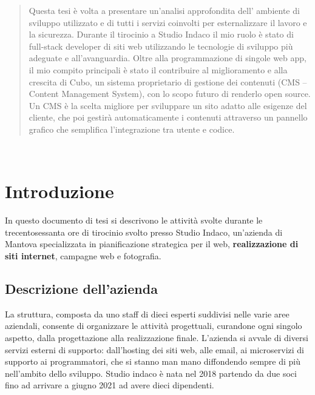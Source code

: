 \documentclass[12pt,a4paper]{article}
\begin{document}
\clearpage

\begin{abstract}
\normalsize
Questa tesi è volta a presentare un’analisi approfondita dell' ambiente di sviluppo utilizzato e di tutti i servizi coinvolti per esternalizzare il lavoro e la sicurezza.
Durante il tirocinio a Studio Indaco il mio ruolo è stato di full-stack developer di siti web utilizzando le tecnologie di sviluppo più adeguate e all’avanguardia.
Oltre alla programmazione di singole web app, il mio compito principali è stato il contribuire al miglioramento e alla crescita di Cubo, un sistema proprietario di gestione dei contenuti (CMS – Content Management System), con lo scopo futuro di renderlo open source. Un CMS è la scelta migliore per sviluppare un sito adatto alle esigenze del cliente, che poi gestirà automaticamente i contenuti attraverso un pannello grafico che semplifica l'integrazione tra utente e codice.

\end{abstract}
\clearpage
\tableofcontents{}
\clearpage

\newpage
\
\newpage

\section{Introduzione}
In questo documento di tesi si descrivono le attività svolte durante le trecentosessanta ore di tirocinio svolto presso Studio Indaco, un'azienda di Mantova specializzata in pianificazione strategica per il web, \textbf{realizzazione di siti internet}, campagne web e fotografia.
\subsection{Descrizione dell'azienda}
La struttura, composta da uno staff di dieci esperti suddivisi nelle varie aree aziendali, consente di organizzare le attività progettuali, curandone ogni singolo aspetto, dalla progettazione alla realizzazione finale.
L’azienda si avvale di diversi servizi esterni di supporto: dall’hosting dei siti web, alle email, ai microservizi di supporto ai programmatori, che si stanno man mano diffondendo sempre di più nell’ambito dello sviluppo.
Studio indaco è nata nel 2018 partendo da due soci fino ad arrivare a giugno 2021 ad avere dieci dipendenti.
\end{document}
